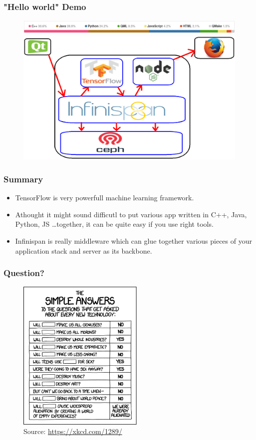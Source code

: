 \documentclass[10pt,utf8]{beamer}
\begin{document}
\begin{frame}
	\frametitle{"Hello world" Demo}
	\begin{figure}
		\centering
		\includegraphics[width=12cm]{./img/demo_github.eps} \\
		\vspace{0.4cm}
		\includegraphics[width=12cm]{./img/demo_arch.eps}
	\end{figure}
\end{frame}

\begin{frame}
	\frametitle{Summary}
	\begin{itemize}
		\item TensorFlow is very powerfull machine learning framework.
		\pause
		\item Athought it might sound difficutl to put various app written in C++, Java, Python, JS \dots together, it can be quite easy if you use right tools.
		\pause
		\item Infinispan is really middleware which can glue together various pieces of your application stack and server as its backbone.
	\end{itemize}
\end{frame}

\begin{frame}
	\frametitle{Question?}
	\begin{figure}
		\centering
		\includegraphics[width=6cm]{./img/simple_answers.eps}
		\caption{\tiny{Source: \url{https://xkcd.com/1289/}}}
	\end{figure}
\end{frame}
\end{document}
